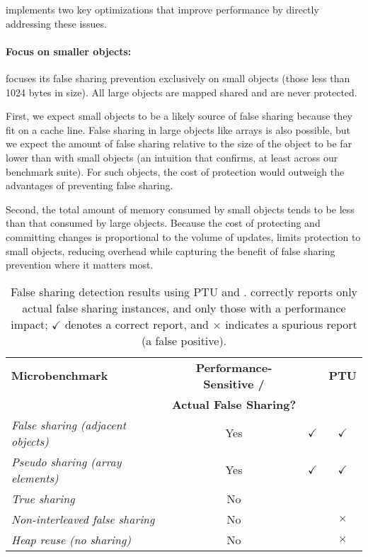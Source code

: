 \sheriffprotect{} implements two key optimizations that improve performance by directly addressing these issues.

\paragraph{Focus on smaller objects:}
  \sheriffprotect{} focuses its false sharing prevention exclusively
  on small objects (those less than 1024 bytes in size). All large
  objects are mapped shared and are never protected. 

  First, we expect small objects to be a likely source of false
  sharing because they fit on a cache line. False sharing in large
  objects like arrays is also possible, but we expect the amount of
  false sharing relative to the size of the object to be far lower
  than with small objects (an intuition that \sheriffdetect{}
  confirms, at least across our benchmark suite). For such objects,
  the cost of protection would outweigh the advantages of
  preventing false sharing.

  Second, the total amount of memory consumed by small objects tends
  to be less than that consumed by large objects. Because the cost of
  protecting and committing changes is proportional to the volume of
  updates, \sheriffprotect{} limits protection to small objects,
  reducing overhead while capturing the benefit of false sharing
  prevention where it matters most.

\begin{table*}[!t]
\centering
\begin{tabular}{l|c|c|c}
\hline
{\bf \small Microbenchmark} & {\bf \small Performance-Sensitive /} & {\bf \small \sheriffdetect{} } & {\bf \small PTU } \\
 & {\bf \small Actual False Sharing?} & & \\
\hline

\small {\em False sharing (adjacent objects)} & Yes & $\checkmark$ & $\checkmark$\\
\small {\em Pseudo sharing (array elements)} & Yes & $\checkmark$ & $\checkmark$\\
\hline
\small {\em True sharing} & No &  & \\
\small {\em Non-interleaved false sharing} & No  & & $\times$\\
\small {\em Heap reuse (no sharing)} & No & & $\times$\\
\hline
\end{tabular}
\caption{False sharing detection results using PTU and \sheriffdetect{}. 
\sheriffdetect{}
correctly reports only actual false sharing instances, and only those with a
performance impact; $\checkmark$ denotes a correct report, and
$\times$ indicates a spurious report (a false positive).
\label{table:microbenchmarks}}
\end{table*}


